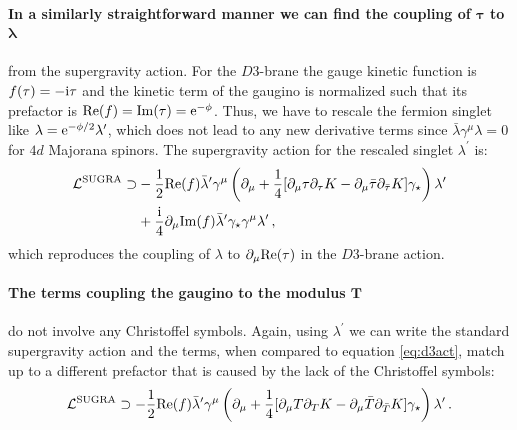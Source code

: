\documentclass[a4paper,12pt,twoside,openright]{report}
\newcommand{\be}{\begin{equation}}
\newcommand{\ee}{\end{equation}}
\newcommand{\bea}{\begin{equation}\begin{aligned}}
\newcommand{\eea}{\end{aligned}\end{equation}}
\def\rmi{{\rm i}}
\def\rme{{\rm e}}
\def\rmre{{\rm Re}}
\def\rmim{{\rm Im}}
\begin{document}
\paragraph{In a similarly straightforward manner we can find the coupling of $\mathbf{\tau}$ to $\mathbf{\lambda}$} from the supergravity action. For the $D3$-brane the gauge kinetic function is $f(\tau) = -\rmi \tau$ and the kinetic term of the gaugino is normalized such that its prefactor is $\rmre(f) = \rmim(\tau) = \rme^{-\phi}$. Thus, we have to rescale the fermion singlet like $\lambda = \rme^{-\phi/2} \lambda^\prime$, which does not lead to any new derivative terms since $\bar{\lambda} \gamma^\mu \lambda =0$ for $4d$ Majorana spinors. The supergravity action for the rescaled singlet $\lambda^\prime$ is:
\bea 
\mathcal{L}^{\text{SUGRA}} \supset &-\frac{1}{2} \rmre(f) \bar{\lambda}^\prime \gamma^\mu \left( \partial_\mu + \frac{1}{4} [\partial_\mu \tau \partial_\tau K - \partial_\mu \bar{\tau} \partial_{\bar{\tau}} K ] \gamma_\star \right) \lambda^\prime\\
&+ \frac{\rmi}{4} \partial_\mu \rmim(f)\bar{\lambda}^\prime \gamma_\star \gamma^\mu \lambda^\prime\,,
\eea
which reproduces the coupling of $\lambda$ to $\partial_\mu \rmre(\tau)$ in the $D3$-brane action.
\paragraph{The terms coupling the gaugino to the modulus $\mathbf{T}$} do not involve any Christoffel symbols. Again, using $\lambda^\prime$ we can write the standard supergravity action and the terms, when compared to equation \eqref{eq:d3act}, match up to a different prefactor that is caused by the lack of the Christoffel symbols:
\be
\mathcal{L}^{\text{SUGRA}} \supset - \frac{1}{2} \rmre(f) \bar{\lambda}^\prime \gamma^\mu \left( \partial_\mu + \frac{1}{4} [\partial_\mu T \partial_T K - \partial_\mu \bar{T} \partial_{\bar{T}} K]\gamma_\star\right) \lambda^\prime\,.
\ee
\end{document}
